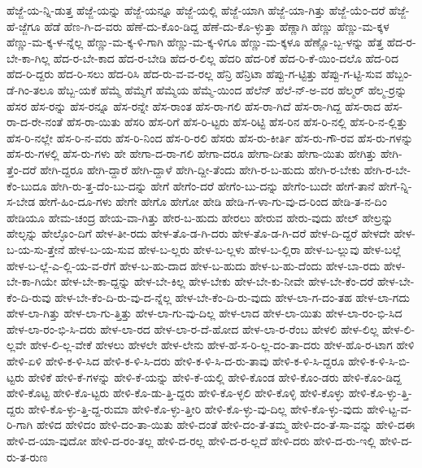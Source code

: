 {ಹೆಜ್ಜೆ-ಯ-ನ್ನಿ-ಡುತ್ತ
ಹೆಜ್ಜೆ-ಯನ್ನು
ಹೆಜ್ಜೆ-ಯನ್ನೂ
ಹೆಜ್ಜೆ-ಯಲ್ಲಿ
ಹೆಜ್ಜೆ-ಯಾಗಿ
ಹೆಜ್ಜೆ-ಯಾ-ಗಿತ್ತು
ಹೆಜ್ಜೆ-ಯೆಂ-ದರೆ
ಹೆಜ್ಜೆ-ಹೆ-ಜ್ಜೆಗೂ
ಹೆಡೆ
ಹೆಣ-ಗಿ-ದ-ವರು
ಹೆಣೆ-ದು-ಕೊಂ-ಡಿದ್ದ
ಹೆಣೆ-ದು-ಕೊ-ಳ್ಳುತ್ತಾ
ಹೆಣ್ಣಾಗಿ
ಹೆಣ್ಣು
ಹೆಣ್ಣು-ಮ-ಕ್ಕಳ
ಹೆಣ್ಣು-ಮ-ಕ್ಕ-ಳ-ನ್ನೆಲ್ಲ
ಹೆಣ್ಣು-ಮ-ಕ್ಕ-ಳಿ-ಗಾಗಿ
ಹೆಣ್ಣು-ಮ-ಕ್ಕ-ಳಿಗೂ
ಹೆಣ್ಣು-ಮ-ಕ್ಕಳೂ
ಹೆಣ್ಣೊ-ಬ್ಬ-ಳನ್ನು
ಹೆತ್ತ
ಹೆದ-ರ-ಬೇ-ಕಾ-ಗಿಲ್ಲ
ಹೆದ-ರ-ಬೇ-ಕಾದ
ಹೆದ-ರ-ಬೇಡಿ
ಹೆದ-ರ-ಲಿಲ್ಲ
ಹೆದರಿ
ಹೆದ-ರಿಕೆ
ಹೆದ-ರಿ-ಕೆ-ಯಿಂ-ದಲೊ
ಹೆದ-ರಿದ
ಹೆದ-ರಿ-ದ್ದರು
ಹೆದ-ರಿ-ಸಲು
ಹೆದ-ರಿಸಿ
ಹೆದ-ರು-ವ-ವ-ರಲ್ಲ
ಹೆನ್ರಿ
ಹೆನ್ರಿಟಾ
ಹೆಪ್ಪು-ಗ-ಟ್ಟಿತ್ತು
ಹೆಪ್ಪು-ಗ-ಟ್ಟಿ-ಸುವ
ಹೆಬ್ಬಂ-ಡೆ-ಗಿಂ-ತಲೂ
ಹೆಬ್ಬ-ಯಕೆ
ಹೆಮ್ಮೆ
ಹೆಮ್ಮೆಗೆ
ಹೆಮ್ಮೆಯ
ಹೆಮ್ಮೆ-ಯಿಂದ
ಹೆಲೆನ್
ಹೆಲೆ-ನ್-ಅ-ವರ
ಹೆಲ್ಮರ್
ಹೆಲ್ಮ-ರ್ರನ್ನು
ಹೆಸರ
ಹೆಸ-ರನ್ನು
ಹೆಸ-ರನ್ನೂ
ಹೆಸ-ರನ್ನೇ
ಹೆಸ-ರಾಂತ
ಹೆಸ-ರಾ-ಗಲಿ
ಹೆಸ-ರಾ-ಗಿದೆ
ಹೆಸ-ರಾ-ಗಿದ್ದ
ಹೆಸ-ರಾದ
ಹೆಸ-ರಾ-ದ-ರೇ-ನಂತೆ
ಹೆಸ-ರಾ-ಯಿತು
ಹೆಸರಿ
ಹೆಸ-ರಿಗೆ
ಹೆಸ-ರಿ-ಟ್ಟರು
ಹೆಸ-ರಿಟ್ಟಿ
ಹೆಸ-ರಿನ
ಹೆಸ-ರಿ-ನಲ್ಲಿ
ಹೆಸ-ರಿ-ನ-ಲ್ಲಿತ್ತು
ಹೆಸ-ರಿ-ನಲ್ಲೇ
ಹೆಸ-ರಿ-ನ-ವರು
ಹೆಸ-ರಿ-ನಿಂದ
ಹೆಸ-ರಿ-ರಲಿ
ಹೆಸರು
ಹೆಸ-ರು-ಕೀರ್ತಿ
ಹೆಸ-ರು-ಗೌ-ರವ
ಹೆಸ-ರು-ಗಳನ್ನು
ಹೆಸ-ರು-ಗಳಲ್ಲಿ
ಹೆಸ-ರು-ಗಳು
ಹೇ
ಹೇಗಾ-ದ-ರಾ-ಗಲಿ
ಹೇಗಾ-ದರೂ
ಹೇಗಾ-ದೀತು
ಹೇಗಾ-ಯಿತು
ಹೇಗಿತ್ತು
ಹೇಗಿ-ತ್ತೆಂ-ದರೆ
ಹೇಗಿ-ದ್ದರೂ
ಹೇಗಿ-ದ್ದಾರೆ
ಹೇಗಿ-ದ್ದಾಳೆ
ಹೇಗಿ-ದ್ದೀ-ತೆಂದು
ಹೇಗಿ-ರ-ಬ-ಹುದು
ಹೇಗಿ-ರ-ಬೇಕು
ಹೇಗಿ-ರ-ಬೇ-ಕೆಂ-ಬುದೂ
ಹೇಗಿ-ರು-ತ್ತ-ದೆಂ-ಬು-ದನ್ನು
ಹೇಗೆ
ಹೇಗೆಂ-ದರೆ
ಹೇಗೆಂ-ಬು-ದನ್ನು
ಹೇಗೆಂ-ಬುದೇ
ಹೇಗೆ-ತಾನೆ
ಹೇಗೆ-ನ್ನಿ-ಸ-ಬೇಡ
ಹೇಗೆ-ಹಿಂ-ದೂ-ಗಳು
ಹೇಗೇ
ಹೇಗೊ
ಹೇಗೋ
ಹೇಡಿ
ಹೇಡಿ-ಗ-ಳಾ-ಗು-ವು-ದ-ರಿಂದ
ಹೇಡಿ-ತ-ನ-ದಿಂ
ಹೇಡಿಯೂ
ಹೇಮ-ಚಂದ್ರ
ಹೇಯ-ವಾ-ಗಿತ್ತು
ಹೇರ-ಬ-ಹುದು
ಹೇರಲು
ಹೇರುವ
ಹೇರು-ವುದು
ಹೇಲ್
ಹೇಲ್ರನ್ನು
ಹೇಲ್ಳನ್ನು
ಹೇಲ್ಳೊಂ-ದಿಗೆ
ಹೇಳ-ತೀ-ರದು
ಹೇಳ-ತೊ-ಡ-ಗಿ-ದರು
ಹೇಳ-ತೊ-ಡ-ಗಿ-ದರೆ
ಹೇಳ-ದಿ-ದ್ದರೆ
ಹೇಳದೇ
ಹೇಳ-ಬ-ಯ-ಸು-ತ್ತೇನೆ
ಹೇಳ-ಬ-ಯ-ಸುವ
ಹೇಳ-ಬ-ಲ್ಲರು
ಹೇಳ-ಬ-ಲ್ಲಳು
ಹೇಳ-ಬ-ಲ್ಲಿರಾ
ಹೇಳ-ಬ-ಲ್ಲುವು
ಹೇಳ-ಬಲ್ಲೆ
ಹೇಳ-ಬ-ಲ್ಲೆ-ಎ-ಲ್ಲಿ-ಯ-ವ-ರೆಗೆ
ಹೇಳ-ಬ-ಹು-ದಾದ
ಹೇಳ-ಬ-ಹುದು
ಹೇಳ-ಬ-ಹು-ದೆಂದು
ಹೇಳ-ಬಾ-ರದು
ಹೇಳ-ಬೇ-ಕಾ-ಗಿಯೇ
ಹೇಳ-ಬೇ-ಕಾ-ದ್ದನ್ನು
ಹೇಳ-ಬೇ-ಕಿಲ್ಲ
ಹೇಳ-ಬೇಕು
ಹೇಳ-ಬೇ-ಕು-ನೀವೇ
ಹೇಳ-ಬೇ-ಕೆಂ-ದರೆ
ಹೇಳ-ಬೇ-ಕೆಂ-ದಿ-ರುವು
ಹೇಳ-ಬೇ-ಕೆಂ-ದಿ-ರು-ವು-ದ-ನ್ನೆಲ್ಲ
ಹೇಳ-ಬೇ-ಕೆಂ-ದಿ-ರು-ವುದು
ಹೇಳ-ಲಾ-ಗ-ದಂ-ತಹ
ಹೇಳ-ಲಾ-ಗದು
ಹೇಳ-ಲಾ-ಗಿತ್ತು
ಹೇಳ-ಲಾ-ಗು-ತ್ತಿತ್ತು
ಹೇಳ-ಲಾ-ಗು-ವು-ದಿಲ್ಲ
ಹೇಳ-ಲಾದ
ಹೇಳ-ಲಾ-ಯಿತು
ಹೇಳ-ಲಾ-ರಂ-ಭಿ-ಸಿದ
ಹೇಳ-ಲಾ-ರಂ-ಭಿ-ಸಿ-ದರು
ಹೇಳ-ಲಾ-ರದ
ಹೇಳ-ಲಾ-ರ-ದೆ-ಹೋದ
ಹೇಳ-ಲಾ-ರ-ರೆಂಬ
ಹೇಳಲಿ
ಹೇಳ-ಲಿಲ್ಲ
ಹೇಳ-ಲಿ-ಲ್ಲವೇ
ಹೇಳ-ಲಿ-ಲ್ಲ-ವೇಕೆ
ಹೇಳಲು
ಹೇಳಲೇ
ಹೇಳ-ಲೇನು
ಹೇಳ-ಹೆ-ಸ-ರಿ-ಲ್ಲ-ದಂ-ತಾ-ದರು
ಹೇಳ-ಹೊ-ರ-ಟಾಗ
ಹೇಳಿ
ಹೇಳಿ-ಏಳಿ
ಹೇಳಿ-ಕ-ಳಿ-ಸಿದ
ಹೇಳಿ-ಕ-ಳಿ-ಸಿ-ದರು
ಹೇಳಿ-ಕ-ಳಿ-ಸಿ-ದ-ರು-ತಾವು
ಹೇಳಿ-ಕ-ಳಿ-ಸಿ-ದ್ದರೂ
ಹೇಳಿ-ಕ-ಳಿ-ಸಿ-ಬಿ-ಟ್ಟರು
ಹೇಳಿಕೆ
ಹೇಳಿ-ಕೆ-ಗಳನ್ನು
ಹೇಳಿ-ಕೆ-ಯನ್ನು
ಹೇಳಿ-ಕೆ-ಯಲ್ಲಿ
ಹೇಳಿ-ಕೊಂಡ
ಹೇಳಿ-ಕೊಂ-ಡರು
ಹೇಳಿ-ಕೊಂ-ಡಿದ್ದ
ಹೇಳಿ-ಕೊಟ್ಟ
ಹೇಳಿ-ಕೊ-ಟ್ಟರು
ಹೇಳಿ-ಕೊ-ಡು-ತ್ತಿ-ದ್ದರು
ಹೇಳಿ-ಕೊ-ಳ್ಳಲಿ
ಹೇಳಿ-ಕೊಳ್ಳಿ
ಹೇಳಿ-ಕೊಳ್ಳು
ಹೇಳಿ-ಕೊ-ಳ್ಳು-ತ್ತಿ-ದ್ದರು
ಹೇಳಿ-ಕೊ-ಳ್ಳು-ತ್ತಿ-ದ್ದ-ರುಮಾ
ಹೇಳಿ-ಕೊ-ಳ್ಳು-ತ್ತೀರಿ
ಹೇಳಿ-ಕೊ-ಳ್ಳು-ವು-ದಿಲ್ಲ
ಹೇಳಿ-ಕೊ-ಳ್ಳು-ವುದು
ಹೇಳಿ-ಟ್ಟ-ವ-ರಿ-ಗಾಗಿ
ಹೇಳಿದ
ಹೇಳಿದಂ
ಹೇಳಿ-ದಂ-ತಾ-ಯಿತು
ಹೇಳಿ-ದಂತೆ
ಹೇಳಿ-ದಂ-ತೆ-ತಮ್ಮ
ಹೇಳಿ-ದಂ-ತೆ-ಸಾ-ವನ್ನು
ಹೇಳಿ-ದಈ
ಹೇಳಿ-ದ-ಯಾ-ವುದೋ
ಹೇಳಿ-ದ-ರಂ-ತಲ್ಲ
ಹೇಳಿ-ದ-ರಲ್ಲ
ಹೇಳಿ-ದ-ರ-ಲ್ಲದೆ
ಹೇಳಿ-ದರು
ಹೇಳಿ-ದ-ರು-ಇಲ್ಲಿ
ಹೇಳಿ-ದ-ರು-ತ-ರುಣ
}
